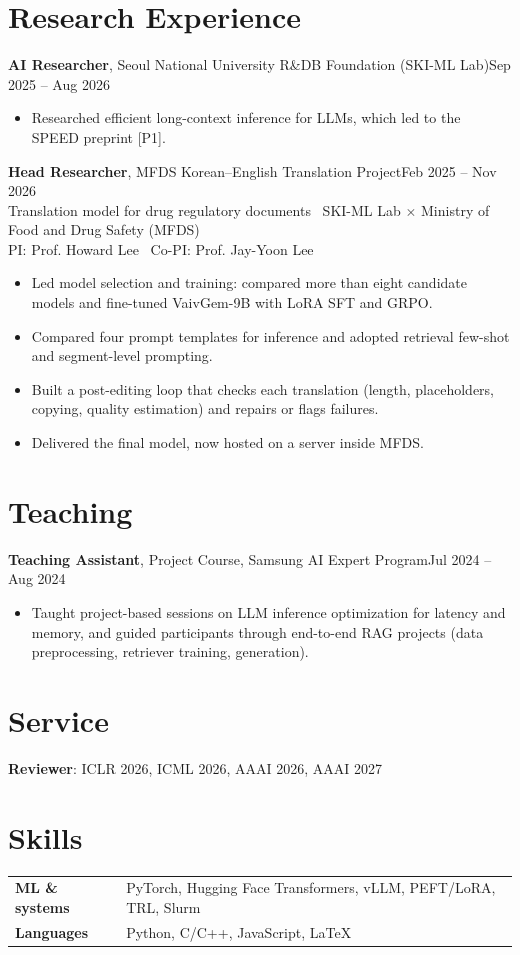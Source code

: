 \documentclass[10pt]{article}
\newcommand{\when}[1]{\hfill{\color{muted}#1}}
\newcommand{\sub}[1]{{\color{muted}#1}}
\begin{document}
\section{Research Experience}
\textbf{AI Researcher}, Seoul National University R\&DB Foundation (SKI-ML Lab)\when{Sep 2025 -- Aug 2026}
\begin{itemize}
  \item Researched efficient long-context inference for LLMs, which led to the SPEED preprint [P1].
\end{itemize}
\vspace{4pt}
\textbf{Head Researcher}, MFDS Korean--English Translation Project\when{Feb 2025 -- Nov 2026}\\
\sub{Translation model for drug regulatory documents \textperiodcentered\ SKI-ML Lab $\times$ Ministry of Food and Drug Safety (MFDS)}\\
\sub{PI: Prof. Howard Lee \textperiodcentered\ Co-PI: Prof. Jay-Yoon Lee}
\begin{itemize}
  \item Led model selection and training: compared more than eight candidate models and fine-tuned VaivGem-9B with LoRA SFT and GRPO.
  \item Compared four prompt templates for inference and adopted retrieval few-shot and segment-level prompting.
  \item Built a post-editing loop that checks each translation (length, placeholders, copying, quality estimation) and repairs or flags failures.
  \item Delivered the final model, now hosted on a server inside MFDS.
\end{itemize}

\section{Teaching}
\textbf{Teaching Assistant}, Project Course, Samsung AI Expert Program\when{Jul 2024 -- Aug 2024}
\begin{itemize}
  \item Taught project-based sessions on LLM inference optimization for latency and memory, and guided participants through end-to-end RAG projects (data preprocessing, retriever training, generation).
\end{itemize}

\section{Service}
\textbf{Reviewer}: ICLR 2026, ICML 2026, AAAI 2026, AAAI 2027

\section{Skills}
\begin{tabularx}{\linewidth}{@{}l X@{}}
  \textbf{ML \& systems} & PyTorch, Hugging Face Transformers, vLLM, PEFT/LoRA, TRL, Slurm\\
  \textbf{Languages} & Python, C/C++, JavaScript, \LaTeX\\
\end{tabularx}
\end{document}
